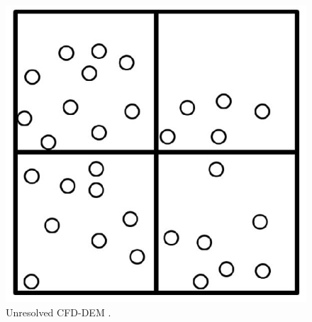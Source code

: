 \begin{figure}[!htb]
\centering
\includegraphics[width=.50\columnwidth]{images/130unresolvedcfddem}
\caption[Unresolved CFD-DEM]{Unresolved CFD-DEM \cite{Refworks:202}.}
\label{fig:130unresolvedcfddem}
\end{figure}
